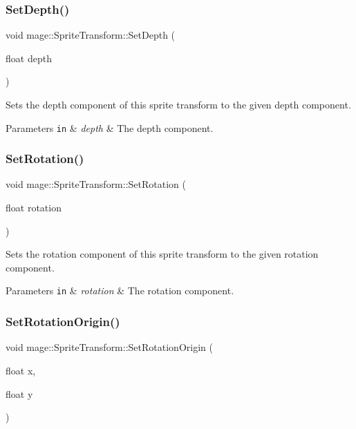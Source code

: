 \subsubsection{\texorpdfstring{Set\+Depth()}{SetDepth()}}
{\footnotesize\ttfamily void mage\+::\+Sprite\+Transform\+::\+Set\+Depth (\begin{DoxyParamCaption}\item[{float}]{depth }\end{DoxyParamCaption})}

Sets the depth component of this sprite transform to the given depth component.


\begin{DoxyParams}[1]{Parameters}
\mbox{\tt in}  & {\em depth} & The depth component. \\
\hline
\end{DoxyParams}
\hypertarget{structmage_1_1_sprite_transform_a23921afd58b631f297328cf2b34d5c40}{}\label{structmage_1_1_sprite_transform_a23921afd58b631f297328cf2b34d5c40} 
\subsubsection{\texorpdfstring{Set\+Rotation()}{SetRotation()}}
{\footnotesize\ttfamily void mage\+::\+Sprite\+Transform\+::\+Set\+Rotation (\begin{DoxyParamCaption}\item[{float}]{rotation }\end{DoxyParamCaption})}

Sets the rotation component of this sprite transform to the given rotation component.


\begin{DoxyParams}[1]{Parameters}
\mbox{\tt in}  & {\em rotation} & The rotation component. \\
\hline
\end{DoxyParams}
\hypertarget{structmage_1_1_sprite_transform_a48e720840181b0da09989b739102c294}{}\label{structmage_1_1_sprite_transform_a48e720840181b0da09989b739102c294} 
\subsubsection{\texorpdfstring{Set\+Rotation\+Origin()}{SetRotationOrigin()}\hspace{0.1cm}{\footnotesize\ttfamily [1/3]}}
{\footnotesize\ttfamily void mage\+::\+Sprite\+Transform\+::\+Set\+Rotation\+Origin (\begin{DoxyParamCaption}\item[{float}]{x,  }\item[{float}]{y }\end{DoxyParamCaption})}

